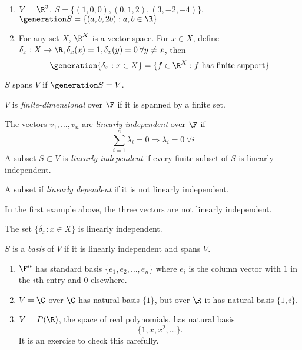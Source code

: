 \documentclass[a4paper]{article}
\theoremstyle{definition}
\begin{document}
\begin{eg}\leavevmode
  \begin{enumerate}
 \item $V=\R^3$, $S = \{(1,0,0),(0,1,2),(3,-2,-4)\}$, $\generation S = \{(a,b,2b): a,b\in \R \}$
 \item For any set $X$, $\R^X$ is a vector space. For $x \in X$, define $\delta_x: X \to \R, \delta_x(x) = 1, \delta_x(y) = 0 \: \forall y \neq x$, then
   \[
     \generation{\delta_x: x\in X} = \{f\in \R^X: f \text{ has finite support} \}
   \]
  \end{enumerate} 
\end{eg}

\begin{definition}[Span]
  $S$ spans $V$ if $\generation S = V$.
\end{definition}

\begin{definition}
  $V$ is \emph{finite-dimensional} over $\F$ if it is spanned by a finite set.
\end{definition}

\begin{definition}
  The vectors $v_1,\ldots, v_n$ are \emph{linearly independent} over $\F$ if
  \[
    \sum_{i=1}^n \lambda_i = 0 \Rightarrow \lambda_i = 0 \: \forall i
  \]
  A subset $S \subset V$ is \emph{linearly independent} if every finite subset of $S$ is linearly independent.

  A subset if \emph{linearly dependent} if it is not linearly independent.
\end{definition}

\begin{eg}
  In the first example above, the three vectors are not linearly independent.
\end{eg}

\begin{ex}
  The set $\{\delta_x: x \in X\}$ is linearly independent.
\end{ex}

\begin{definition}[Basis]
  $S$ is a \emph{basis} of $V$ if it is linearly independent and spans $V$.
\end{definition}

\begin{eg}\leavevmode
  \begin{enumerate}
  \item $\F^n$ has standard basis $\{e_1,e_2,\ldots,e_n\}$ where $e_i$ is the column vector with $1$ in the $i$th entry and $0$ elsewhere.
  \item $V=\C$ over $\C$ has natural basis $\{1\}$, but over $\R$ it has natural basis $\{1, i\}$.
  \item $V=P(\R)$, the space of real polynomials, has natural basis
    \[
      \{1, x, x^2, \dots \}.
    \]
    It is an exercise to check this carefully.
    \end{enumerate}
\end{eg}
\end{document}
